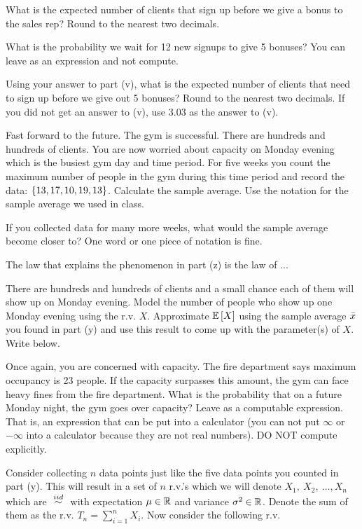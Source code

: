 \documentclass[12pt]{article}
\begin{document}
 What is the expected number of clients that sign up before we give a bonus to the sales rep? Round to the nearest two decimals.  

 What is the probability we wait for 12 new signups to give 5 bonuses? You can leave as an expression and not compute. 

 Using your answer to part (v), what is the expected number of clients that need to sign up before we give out 5 bonuses? Round to the nearest two decimals. If you did not get an answer to (v), use 3.03 as the answer to (v). 

 Fast forward to the future. The gym is successful. There are hundreds and hundreds of clients. You are now worried about capacity on Monday evening which is the busiest gym day and time period. For five weeks you count the maximum number of people in the gym during this time period and record the data: $\left\{13,17,10,19,13\right\}$. Calculate the sample average. Use the notation for the sample average we used in class.

 If you collected data for many more weeks, what would the sample average become closer to? One word or one piece of notation is fine. 

 The law that explains the phenomenon in part (z) is the law of ...

 There are hundreds and hundreds of clients and a small chance each of them will show up on  Monday evening. Model the number of people who show up one Monday evening using the r.v. $X$. Approximate $\mathbb{E}\left[X\right]$  using the sample average $\bar{x}$ you found in part (y) and use this result to come up with the parameter(s) of $X$. Write  below. 

 Once again, you are concerned with capacity. The fire department says maximum occupancy is 23 people. If the capacity surpasses this amount, the gym can face heavy fines from the fire department. What is the probability that on a future Monday night, the gym goes over capacity? Leave as a computable expression. That is, an expression that can be put into a calculator (you can not put $\infty$ or $-\infty$ into a calculator because they are not real numbers). DO NOT compute explicitly. 

 Consider collecting $n$ data points just like the five data points you counted in part (y). This will result in a set of $n$ r.v.'s which we will denote $X_1,~X_2,~\ldots, X_n$ which are $\iid$ with expectation $\mu \in \mathbb{R}$ and variance $\sigma^2 \in \mathbb{R}$. Denote the sum of them as the r.v. $T_n = \sum_{i=1}^n X_i$. Now consider the following r.v.
\end{document}
